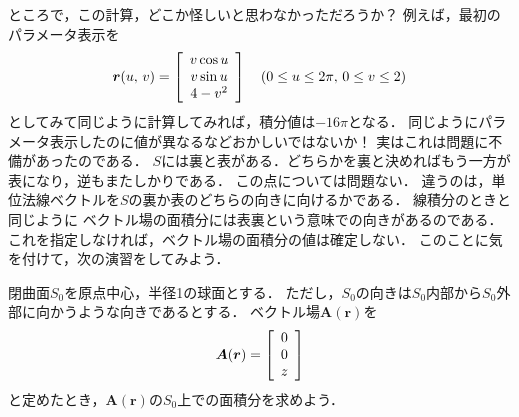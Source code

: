 ところで，この計算，どこか怪しいと思わなかっただろうか？ 例えば，最初のパラメータ表示を
\begin{align*}
\bm{r} (u, \, v) = \left[
\renewcommand{\arraystretch}{1}
\begin{array}{c}
v \cos u  \\ 
v \sin u \\
4 - v^2 
\end{array}
\right]
\quad ( 0 \leq u \leq 2 \pi , \, 0 \leq v \leq 2 )  
\end{align*}
としてみて同じように計算してみれば，積分値は$-16 \pi$となる．
同じようにパラメータ表示したのに値が異なるなどおかしいではないか！ 実はこれは問題に不備があったのである．
$S$には裏と表がある．どちらかを裏と決めればもう一方が表になり，逆もまたしかりである．
この点については問題ない．
違うのは，単位法線ベクトルを$S$の裏か表のどちらの向きに向けるかである．
線積分のときと同じように
ベクトル場の面積分には表裏という意味での向きがあるのである．
これを指定しなければ，ベクトル場の面積分の値は確定しない．
このことに気を付けて，次の演習をしてみよう．

閉曲面$S_0$を原点中心，半径1の球面とする．
ただし，$S_0$の向きは$S_0$内部から$S_0$外部に向かうような向きであるとする．
ベクトル場$\bm{A}(\bm{r})$を
\begin{align*}
\bm{A}(\bm{r}) = \left[
\renewcommand{\arraystretch}{1}
\begin{array}{c}
0 \\
0 \\
z 
\end{array}
\right]
\end{align*}
と定めたとき，$\bm{A}(\bm{r})$の$S_0$上での面積分を求めよう．

